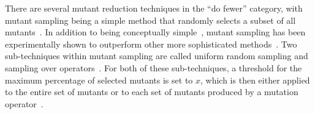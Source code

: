 

There are several mutant reduction techniques in the ``do fewer'' category, with mutant sampling being a simple method
that randomly selects a subset of all mutants~\cite{wong1995reducing}. In addition to being conceptually
simple~\cite{gopinath2015mutation}, mutant sampling has been experimentally shown to outperform other more sophisticated
methods~\cite{zhang2010operator}.  Two sub-techniques within mutant sampling are called uniform random sampling and
sampling over operators~\cite{gopinath2015mutation, gopinath2015empirical}.  For both of these sub-techniques, a
threshold for the maximum percentage of selected mutants is set to $x$, which is then either applied to the entire set
of mutants or to each set of mutants produced by a mutation operator~\cite{gopinath2015mutation, gopinath2015empirical}.






